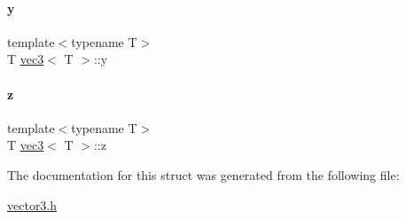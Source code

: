 \mbox{\label{structvec3_a77c2f238c0b2b7895304f5ca64b8d770}} 
\paragraph{\texorpdfstring{y}{y}}
{\footnotesize\ttfamily template$<$typename T$>$ \\
T \mbox{\hyperlink{structvec3}{vec3}}$<$ T $>$\+::y}

\mbox{\label{structvec3_a7879033e3409225479ae0079c92d9afd}} 
\paragraph{\texorpdfstring{z}{z}}
{\footnotesize\ttfamily template$<$typename T$>$ \\
T \mbox{\hyperlink{structvec3}{vec3}}$<$ T $>$\+::z}



The documentation for this struct was generated from the following file\+:\begin{DoxyCompactItemize}
\item 
\mbox{\hyperlink{vector3_8h}{vector3.\+h}}\end{DoxyCompactItemize}
